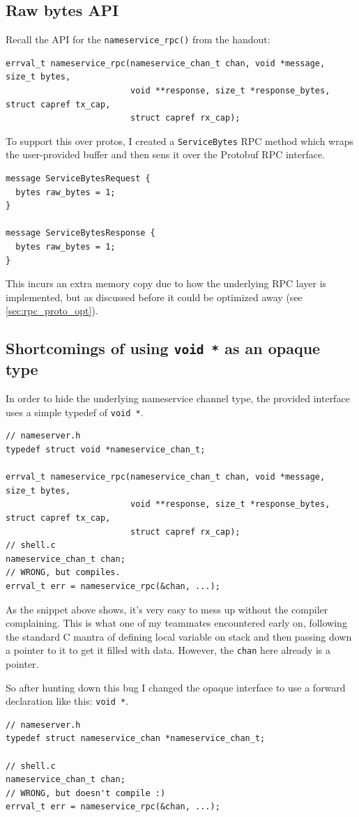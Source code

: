 \subsection{Raw bytes API}
Recall the API for the \texttt{nameservice_rpc()} from the handout:
\begin{verbatim}
errval_t nameservice_rpc(nameservice_chan_t chan, void *message, size_t bytes,
                         void **response, size_t *response_bytes, struct capref tx_cap,
                         struct capref rx_cap);
\end{verbatim}

To support this over protos, I created a \texttt{ServiceBytes} RPC method which wraps the user-provided buffer and then sens it over the Protobuf RPC interface.
\begin{verbatim}
message ServiceBytesRequest {
  bytes raw_bytes = 1;
}

message ServiceBytesResponse {
  bytes raw_bytes = 1;
}
\end{verbatim}

This incurs an extra memory copy due to how the underlying RPC layer is implemented, but as discussed before it could be optimized away (see \autoref{sec:rpc_proto_opt}).

\subsection{Shortcomings of using \texttt{void *} as an opaque type}
In order to hide the underlying nameservice channel type, the provided interface uses a simple typedef of \texttt{void *}.
\begin{verbatim}
// nameserver.h
typedef struct void *nameservice_chan_t;

errval_t nameservice_rpc(nameservice_chan_t chan, void *message, size_t bytes,
                         void **response, size_t *response_bytes, struct capref tx_cap,
                         struct capref rx_cap);
// shell.c
nameservice_chan_t chan;
// WRONG, but compiles.
errval_t err = nameservice_rpc(&chan, ...); 
\end{verbatim}
As the snippet above shows, it's very easy to mess up without the compiler complaining. This is what one of my teammates encountered early on, following the standard C mantra of defining local variable on stack and then passing down a pointer to it to get it filled with data. However, the \texttt{chan} here already is a pointer.

So after hunting down this bug I changed the opaque interface to use a forward declaration like this:
\texttt{void *}.
\begin{verbatim}
// nameserver.h
typedef struct nameservice_chan *nameservice_chan_t;

// shell.c
nameservice_chan_t chan;
// WRONG, but doesn't compile :)
errval_t err = nameservice_rpc(&chan, ...); 
\end{verbatim}

